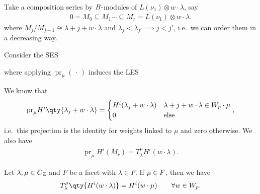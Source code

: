 Take a composition series by \(B{\hbox{-}}\)modules of
\(L(\nu_1) \otimes w\cdot \lambda\), say
\begin{align*}  
0 = M_0 \subseteq M_1 \cdots \subseteq M_r = L(\nu_1) \otimes w\cdot \lambda
.\end{align*}
where \(M_j / M_{j-1} \cong \lambda+j + w\cdot \lambda\) and
\(\lambda_j < \lambda_{j'} \implies j < j'\), i.e.~we can order them in
a decreasing way.

Consider the SES

\begin{center}
\end{center}

where applying \({\operatorname{pr}}_\mu({\,\cdot\,})\) induces the LES

\begin{center}
\end{center}

We know that
\begin{align*}  
{\operatorname{pr}}_\mu H^i\qty{\lambda_j + w\cdot \lambda} = 
\begin{cases}
H^i(\lambda_j + w\cdot \lambda ) & \lambda+j + w\cdot \lambda \in W_p\cdot \mu \\
0 & \text{else}
\end{cases}
,\end{align*}
i.e.~this projection is the identity for weights linked to \(\mu\) and
zero otherwise. We also have
\begin{align*}  
{\operatorname{pr}}_\mu H^i(M_r) = T_\lambda^\mu H^i(w\cdot \lambda)
.\end{align*}

\begin{theorem}[?]

Let
\(\lambda, \mu \in \mkern 1.5mu\overline{\mkern-1.5muC\mkern-1.5mu}\mkern 1.5mu_{\mathbb{Z}}\)
and \(F\) be a facet with \(\lambda \in F\). If
\(\mu \in \mkern 1.5mu\overline{\mkern-1.5muF\mkern-1.5mu}\mkern 1.5mu\),
then we have
\begin{align*}  
T_\lambda^\mu\qty{H^i(w\cdot \lambda)} = H^i(w\cdot \mu) \qquad \forall w\in W_p
.\end{align*}

\end{theorem}

